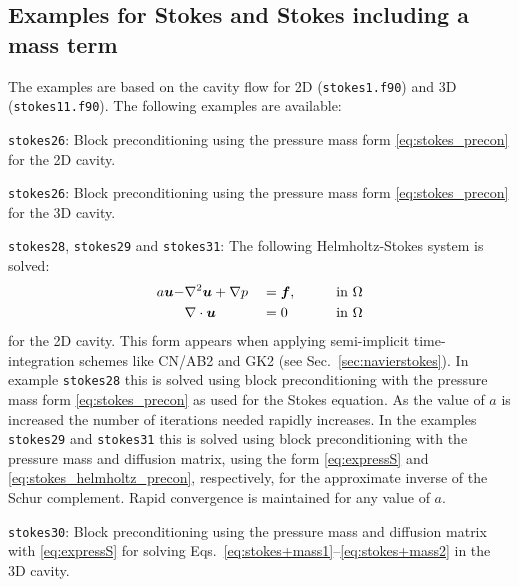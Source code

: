 \subsection{Examples for Stokes and Stokes including a mass term}

The examples are based on the cavity flow for 2D (\texttt{stokes1.f90}) and
3D (\texttt{stokes11.f90}). The following examples are available:
\begin{description}
   \item{\texttt{stokes26}:} Block preconditioning using the pressure mass form
\eqref{eq:stokes_precon} for the 2D cavity.
   \item{\texttt{stokes26}:} Block preconditioning using the pressure mass form
\eqref{eq:stokes_precon} for the 3D cavity.
   \item{\texttt{stokes28}, \texttt{stokes29} and \texttt{stokes31}:}
The following Helmholtz-Stokes system is solved:
\begin{alignat}{3}
a\boldsymbol{u}-&\nabla^2\boldsymbol{u}+\nabla p & &=\boldsymbol{f},&&\qquad\text{in }\Omega
 \label{eq:stokes+mass1}\\
   &\nabla\cdot\boldsymbol{u}& &=0&&\qquad\text{in }\Omega
 \label{eq:stokes+mass2}
\end{alignat}
for the 2D cavity.
This form appears when applying semi-implicit 
time-integration schemes like CN/AB2 and GK2 (see
Sec.~\ref{sec:navierstokes}).
In example \texttt{stokes28} this is solved using
block preconditioning with the pressure mass
form \eqref{eq:stokes_precon} as used for the Stokes equation.
As the value of $a$ is increased the number of iterations needed rapidly
increases.
In the examples \texttt{stokes29} and \texttt{stokes31} this is solved using
block preconditioning with the pressure mass and diffusion matrix, using
the form \eqref{eq:expressS} and \eqref{eq:stokes_helmholtz_precon},
respectively, for the approximate inverse of the Schur complement.
Rapid convergence is maintained for any value of $a$.
   \item{\texttt{stokes30}:} Block preconditioning using the pressure mass and
diffusion matrix with \eqref{eq:expressS} for solving
Eqs.~\eqref{eq:stokes+mass1}--\eqref{eq:stokes+mass2} in 
 the 3D cavity.
\end{description}

